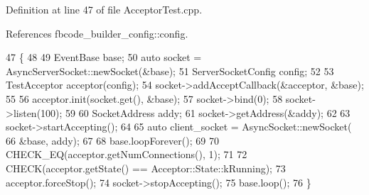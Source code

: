 Definition at line 47 of file Acceptor\+Test.\+cpp.



References fbcode\+\_\+builder\+\_\+config\+::config.


\begin{DoxyCode}
47                           \{
48 
49   EventBase base;
50   \textcolor{keyword}{auto} socket = AsyncServerSocket::newSocket(&base);
51   ServerSocketConfig config;
52 
53   TestAcceptor acceptor(config);
54   socket->addAcceptCallback(&acceptor, &base);
55 
56   acceptor.init(socket.get(), &base);
57   socket->bind(0);
58   socket->listen(100);
59 
60   SocketAddress addy;
61   socket->getAddress(&addy);
62 
63   socket->startAccepting();
64 
65   \textcolor{keyword}{auto} client\_socket = AsyncSocket::newSocket(
66     &base, addy);
67 
68   base.loopForever();
69 
70   CHECK\_EQ(acceptor.getNumConnections(), 1);
71 
72   CHECK(acceptor.getState() == Acceptor::State::kRunning);
73   acceptor.forceStop();
74   socket->stopAccepting();
75   base.loop();
76 \}
\end{DoxyCode}
